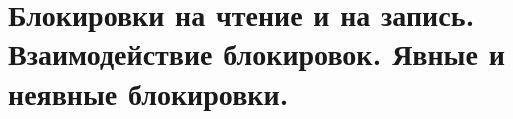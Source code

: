 {
	\section{Блокировки на чтение и на запись. Взаимодействие блокировок. Явные и неявные блокировки.}
	\newpage
}
